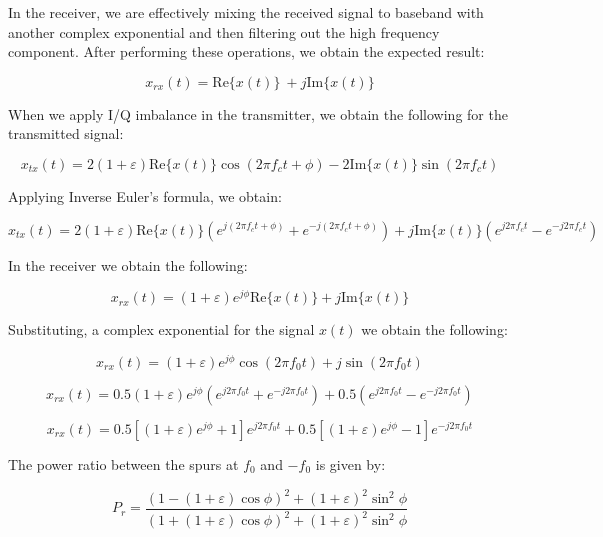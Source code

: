 \documentclass{article}
\begin{document}
In the receiver, we are effectively mixing the received signal to baseband with another complex exponential and then filtering out the high frequency component. After performing these operations, we obtain the expected result:
 
\begin{equation}
	x_{rx}(t) = \text{Re}\{x(t)\}\ + j\text{Im}\{x(t)\}
\end{equation}

When we apply I/Q imbalance in the transmitter, we obtain the following for the transmitted signal:

\begin{equation}
	x_{tx}(t) = 2(1+\varepsilon)\text{Re}\{x(t)\}\cos(2{\pi}f_ct + \phi) - 2\text{Im}\{x(t)\}\sin(2{\pi}f_ct)
\end{equation}

Applying Inverse Euler's formula, we obtain:

\begin{equation}
	x_{tx}(t) = 2(1+\varepsilon)\text{Re}\{x(t)\}(e^{j(2{\pi}f_ct+\phi)} + e^{-j(2{\pi}f_ct+\phi)}) + j\text{Im}\{x(t)\}(e^{j2{\pi}f_ct} - e^{-j2{\pi}f_ct})
\end{equation}

In the receiver we obtain the following:

\begin{equation}
	x_{rx}(t) = (1+\varepsilon)e^{j\phi}\text{Re}\{x(t)\} + j\text{Im}\{x(t)\}
\end{equation}

Substituting, a complex exponential for the signal $x(t)$ we obtain the following:

\begin{equation}
	x_{rx}(t) = (1+\varepsilon)e^{j\phi}\cos(2{\pi}f_0t) + j\sin(2{\pi}f_0t)
\end{equation}

\begin{equation}
	x_{rx}(t) = 0.5(1+\varepsilon)e^{j\phi}(e^{j2{\pi}f_0t} + e^{-j2{\pi}f_0t}) + 0.5(e^{j2{\pi}f_0t} - e^{-j2{\pi}f_0t})
\end{equation}

\begin{equation}
	x_{rx}(t) = 0.5[(1+\varepsilon)e^{j\phi} + 1]e^{j2{\pi}f_0t} + 0.5[(1+\varepsilon)e^{j\phi} - 1]e^{-j2{\pi}f_0t}
\end{equation}

The power ratio between the spurs at $f_0$ and $-f_0$ is given by: 

\begin{equation}
	P_r = \frac{(1-(1+\varepsilon)\cos\phi)^2 + (1+\varepsilon)^2\sin^2\phi}{(1+(1+\varepsilon)\cos\phi)^2 + (1+\varepsilon)^2\sin^2\phi}
\end{equation}
\end{document}
